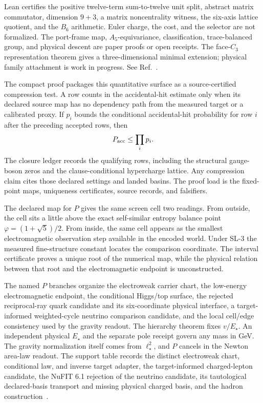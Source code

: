 \documentclass[11pt]{article}
\begin{document}
Lean certifies the positive twelve-term sum-to-twelve unit split, abstract
matrix commutator, dimension \(9+3\), a matrix noncentrality witness, the
six-axis lattice quotient, and the \(B_6\) arithmetic. Euler charge, the cost,
and the selector are not formalized. The port-frame map, \(A_5\)-equivariance, classification,
trace-balanced group, and physical descent are paper proofs or open receipts.
The face-\(C_3\) representation theorem gives a three-dimensional minimal
extension; physical family attachment is work in progress. See
Ref.~\cite{ophcompact}.

The compact proof packages this quantitative surface as a source-certified
compression test. A row counts in the accidental-hit estimate only when its
declared source map has no dependency path from the measured target or a
calibrated proxy. If \(p_i\) bounds the conditional accidental-hit probability
for row \(i\) after the preceding accepted rows, then
\[
P_{\rm acc}\le\prod_i p_i .
\]
The closure ledger records the qualifying rows, including the structural
gauge-boson zeros and the clause-conditional hypercharge lattice. Any compression claim cites
those declared settings and landed basins.
The proof load is the fixed-point maps, uniqueness certificates, source
records, and falsifiers.

The declared map for \(P\) gives the same screen cell two readings. From outside, the cell
sits a little above the exact self-similar
entropy balance point \(\varphi=(1+\sqrt5)/2\). From inside, the same cell appears as the smallest
electromagnetic observation step available in the encoded world. Under SL-3 the measured
fine-structure constant locates the comparison coordinate. The interval certificate proves a
unique root of the numerical map, while the physical relation between that root and the
electromagnetic endpoint is unconstructed.

The named \(P\) branches organize the electroweak carrier chart, the low-energy electromagnetic
endpoint, the conditional Higgs/top surface, the rejected reciprocal-ray quark candidate and its
six-coordinate physical interface, a target-informed weighted-cycle neutrino comparison candidate, and the local cell/edge
consistency used by the gravity readout. The hierarchy theorem fixes \(v/E_\star\). An independent
physical \(E_\star\) and the separate pole receipt govern any mass in GeV. The gravity
normalization itself comes from \(\ell_\star^2\), and \(P\) cancels in the Newton area-law readout.
The support table records the distinct electroweak chart, conditional law, and inverse target adapter,
the target-informed charged-lepton candidate, the NuFIT 6.1 rejection of the neutrino candidate,
its tautological declared-basis transport and missing physical charged basis, and the hadron
construction~\cite{nufit61}.
\end{document}
